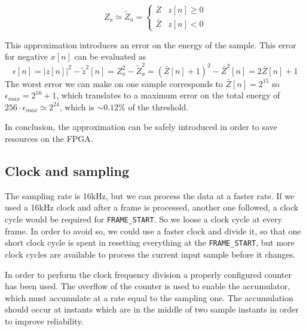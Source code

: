 \begin{equation}
  Z_a \simeq \widetilde{Z}_a = \begin{cases}
    Z & z[n] \ge 0 \\
    \bar{Z} & z[n] < 0
  \end{cases}
\end{equation}

This approximation introduces an error on the energy of the sample.
This error for negative $x[n]$ can be evaluated as
\begin{equation}
  \epsilon[n] = |z[n]|^2 - \tilde{z}^2[n] = Z_a^2 - \widetilde{Z}_a^2 = (\bar{Z}[n] + 1)^2 - \bar{Z}^2[n] = 2\bar{Z}[n] + 1
\end{equation}
The worst error we can make on one sample corresponds to $\bar{Z}[n] = 2^{15}$
so $\epsilon_{max} = 2^{16}+1$, which translates to a maximum error on the total
energy of $256 \cdot \epsilon_{max} \simeq 2^{24}$, which is $\sim 0.12\%$ of the
threshold.

In conclusion, the approximation can be safely introduced in order to save
resources on the FPGA.

\subsection{Clock and sampling}
The sampling rate is 16\si{\kilo\hertz}, but we can process the data at a faster
rate. If we used a 16\si{\kilo\hertz} clock and after a frame is processed,
another one followed, a clock cycle would be required for \texttt{FRAME\_START}.
So we loose a clock cycle at every frame. In order to avoid so, we could use a
faster clock and divide it, so that one short clock cycle is spent in resetting
everything at the \texttt{FRAME\_START}, but more clock cycles are
available to process the current input sample before it changes.

In order to perform the clock frequency division a properly configured counter
has been used. The overflow of the counter is used to enable the accumulator,
which must accumulate at a rate equal to the sampling one.
The accumulation should occur at instants which are in the middle of two sample
instants in order to improve reliability.
